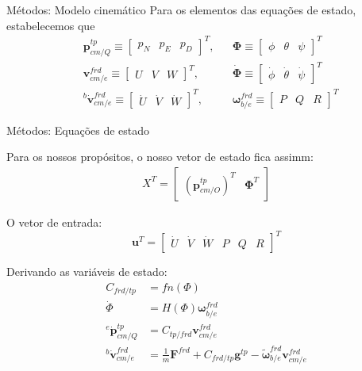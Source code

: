 \documentclass{beamer}
\begin{document}
\begin{frame}{Métodos: Modelo cinemático}
Para os elementos das equações de estado, estabelecemos que
\begin{align*}
    &\mathbf{p}^{tp}_{cm/Q} \equiv \begin{bmatrix} p_{N} & p_{E} & p_{D} \end{bmatrix}^{T},&
    &\mathbf{\Phi} \equiv \begin{bmatrix} \phi & \theta & \psi \end{bmatrix}^{T} \\
    &\mathbf{v}^{frd}_{cm/e} \equiv \begin{bmatrix} U & V & W \end{bmatrix}^{T},&
    &{\dot{\mathbf{\Phi}}} \equiv \begin{bmatrix} \dot{\phi} & \dot{\theta} & \dot{\psi} \end{bmatrix}^{T} \\
    &{^{b}{\dot{\mathbf{v}}}^{frd}_{cm/e}} \equiv \begin{bmatrix} {\dot{U}} & {\dot{V}} & {\dot{W}} \end{bmatrix}^{T}, &
    &\mathbf{\omega}^{frd}_{b/e} \equiv \begin{bmatrix} P & Q & R \end{bmatrix}^{T}
\end{align*}
\end{frame}

\begin{frame}{Métodos: Equações de estado}

Para os nossos propósitos, o nosso vetor de estado fica assimm:
\begin{align*}
    {X}^{T} = \begin{bmatrix} {\left( \mathbf{p}^{tp}_{cm/O} \right)}^{T} & \mathbf{\Phi}^{T} \end{bmatrix}
\end{align*}

O vetor de entrada:
\begin{equation*}
    \mathbf{u}^{T} = \begin{bmatrix} \dot{U} & \dot{V} & \dot{W} & P & Q & R \end{bmatrix}^{T}
\end{equation*}

Derivando as variáveis de estado:
\begin{align*}
    C_{frd/tp} &= fn \left( \Phi \right) \\
    \dot{\Phi} &=  H \left( \Phi \right) {\mathbf{\omega}^{frd}_{b/e}} \\
    {^{e}{\dot{\mathbf{p}}^{tp}_{cm/Q}}} &= {C_{tp/frd}}{\mathbf{v}^{frd}_{cm/e}} \\
    {^{b}{\dot{\mathbf{v}}^{frd}_{cm/e}}} &= \textstyle{\frac{1}{m}} {\mathbf{F}^{frd}} + {C_{frd/tp}}{\mathbf{g}^{tp}} - {\tilde{\mathbf{\omega}}^{frd}_{b/e}} {\mathbf{v}^{frd}_{cm/e}}
\end{align*}

\end{frame}
\end{document}
